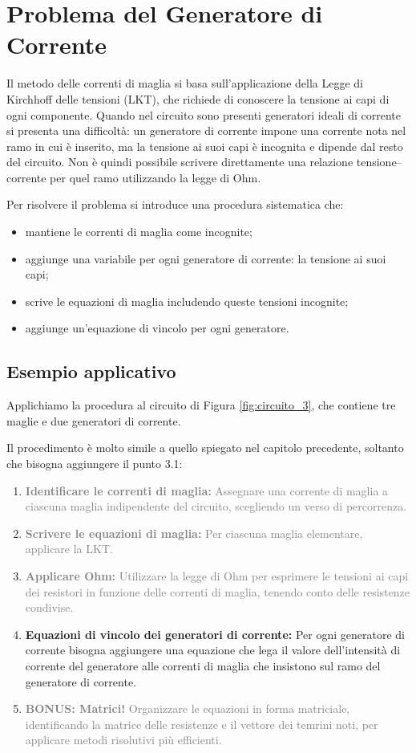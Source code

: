 \section{Problema del Generatore di Corrente}

Il metodo delle correnti di maglia si basa sull’applicazione della Legge di Kirchhoff delle tensioni (LKT), che richiede di conoscere la tensione ai capi di ogni componente. Quando nel circuito sono presenti generatori ideali di corrente si presenta una difficoltà: un generatore di corrente impone una corrente nota nel ramo in cui è inserito, ma la tensione ai suoi capi è incognita e dipende dal resto del circuito. Non è quindi possibile scrivere direttamente una relazione tensione–corrente per quel ramo utilizzando la legge di Ohm.

Per risolvere il problema si introduce una procedura sistematica che:
\begin{itemize}
    \item mantiene le correnti di maglia come incognite;
    \item aggiunge una variabile per ogni generatore di corrente: la tensione ai suoi capi;
    \item scrive le equazioni di maglia includendo queste tensioni incognite;
    \item aggiunge un’equazione di vincolo per ogni generatore.
\end{itemize}


\subsection*{Esempio applicativo}

Applichiamo la procedura al circuito di Figura \ref{fig:circuito_3}, che contiene tre maglie e due generatori di corrente.

Il procedimento è molto simile a quello spiegato nel capitolo precedente, soltanto che bisogna aggiungere il punto 3.1:
\begin{enumerate}
    \item[1.] \textcolor{gray}{\textbf{Identificare le correnti di maglia:} Assegnare una corrente di maglia a ciascuna maglia indipendente del circuito, scegliendo un verso di percorrenza.}
    \item[2.] \textcolor{gray}{\textbf{Scrivere le equazioni di maglia:} Per ciascuna maglia elementare, applicare la LKT.}
    \item[3.] \textcolor{gray}{\textbf{Applicare Ohm:} Utilizzare la legge di Ohm per esprimere le tensioni ai capi dei resistori in funzione delle correnti di maglia, tenendo conto delle resistenze condivise.}
    \item[3.1.] \textbf{Equazioni di vincolo dei generatori di corrente:} Per ogni generatore di corrente bisogna aggiungere una equazione che lega il valore dell'intensità di corrente del generatore alle correnti di maglia che insistono sul ramo del generatore di corrente.
    \item[4.] \textcolor{gray}{\textbf{BONUS: Matrici!} Organizzare le equazioni in forma matriciale, identificando la matrice delle resistenze e il vettore dei temrini noti, per applicare metodi risolutivi più efficienti.}
\end{enumerate}

